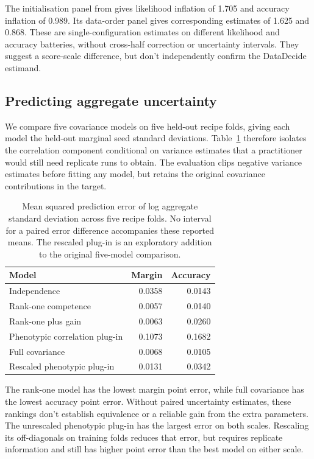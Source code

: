 \documentclass{article}
\begin{document}
The initialisation panel from \citet{heineman2025} gives likelihood inflation of 1.705 and accuracy inflation of 0.989. Its data-order panel gives corresponding estimates of 1.625 and 0.868. These are single-configuration estimates on different likelihood and accuracy batteries, without cross-half correction or uncertainty intervals. They suggest a score-scale difference, but don't independently confirm the DataDecide estimand.

\subsection{Predicting aggregate uncertainty}
We compare five covariance models on five held-out recipe folds, giving each model the held-out marginal seed standard deviations. Table~\ref{tab:prediction} therefore isolates the correlation component conditional on variance estimates that a practitioner would still need replicate runs to obtain. The evaluation clips negative variance estimates before fitting any model, but retains the original covariance contributions in the target.

\begin{table}[!htb]
\centering
\caption{Mean squared prediction error of log aggregate standard deviation across five recipe folds. No interval for a paired error difference accompanies these reported means. The rescaled plug-in is an exploratory addition to the original five-model comparison.}
\label{tab:prediction}
\small\setlength{\tabcolsep}{4pt}\renewcommand{\arraystretch}{1.12}
\begin{tabular}{lrr}
\toprule
Model & Margin & Accuracy\\
\midrule
Independence & 0.0358 & 0.0143\\
Rank-one competence & 0.0057 & 0.0140\\
Rank-one plus gain & 0.0063 & 0.0260\\
Phenotypic correlation plug-in & 0.1073 & 0.1682\\
Full covariance & 0.0068 & 0.0105\\
Rescaled phenotypic plug-in & 0.0131 & 0.0342\\
\bottomrule
\end{tabular}
\end{table}

The rank-one model has the lowest margin point error, while full covariance has the lowest accuracy point error. Without paired uncertainty estimates, these rankings don't establish equivalence or a reliable gain from the extra parameters. The unrescaled phenotypic plug-in has the largest error on both scales. Rescaling its off-diagonals on training folds reduces that error, but requires replicate information and still has higher point error than the best model on either scale.
\end{document}
